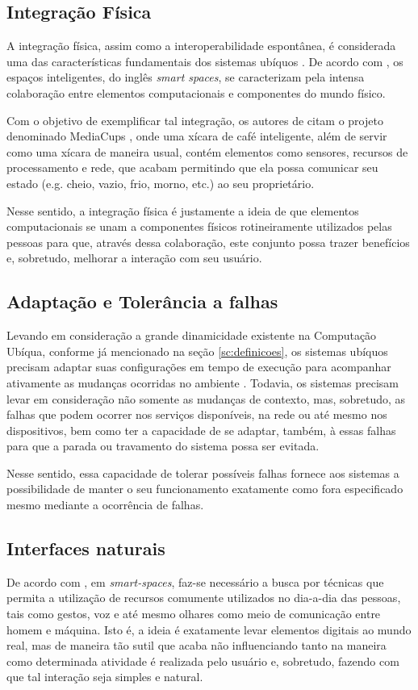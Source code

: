 \subsection{Integração Física}
A integração física, assim como a interoperabilidade espontânea, é considerada uma das características fundamentais dos sistemas ubíquos \citep{kindBerg2012}. De acordo com \cite{gomes2007}, os espaços inteligentes, do inglês \textit{smart spaces}, se caracterizam pela intensa colaboração entre elementos computacionais e componentes do mundo físico. 
	
Com o objetivo de exemplificar tal integração, os autores de \cite{kindBerg2012} citam o projeto denominado MediaCups \citep{mediacups2001}, onde uma xícara de café inteligente, além de servir como uma xícara de maneira usual, contém elementos como sensores, recursos de processamento e rede, que acabam permitindo que ela possa comunicar seu estado (e.g. cheio, vazio, frio, morno, etc.) ao seu proprietário. 
	
Nesse sentido, a integração física é justamente a ideia de que elementos computacionais se unam a componentes físicos rotineiramente utilizados pelas pessoas para que, através dessa colaboração, este conjunto possa trazer benefícios e, sobretudo, melhorar a interação com seu usuário.

\subsection{Adaptação e Tolerância a falhas}
Levando em consideração a grande dinamicidade existente na Computação Ubíqua, conforme já mencionado na seção \ref{sc:definicoes}, os sistemas ubíquos precisam adaptar suas configurações em tempo de execução para acompanhar ativamente as mudanças ocorridas no ambiente \citep{lopes2011}. Todavia, os sistemas precisam levar em consideração não somente as mudanças de contexto, mas, sobretudo, as falhas que podem ocorrer nos serviços disponíveis, na rede ou até mesmo nos dispositivos, bem como ter a capacidade de se adaptar, também, à essas falhas para que a parada ou travamento do sistema possa ser evitada.

Nesse sentido, essa capacidade de tolerar possíveis falhas fornece aos sistemas a possibilidade de manter o seu funcionamento exatamente como fora especificado mesmo mediante a ocorrência de falhas.     

\subsection{Interfaces naturais}
De acordo com \cite{gomes2007}, em \textit{smart-spaces}, faz-se necessário a busca por técnicas que permita a utilização de recursos comumente utilizados no dia-a-dia das pessoas, tais como  gestos, voz e até mesmo olhares como meio de comunicação entre homem e  máquina. Isto é, a ideia é exatamente levar elementos digitais ao mundo real, mas de maneira tão sutil que acaba não influenciando tanto na maneira como determinada atividade é realizada pelo usuário e, sobretudo, fazendo com que tal interação seja simples e natural.

